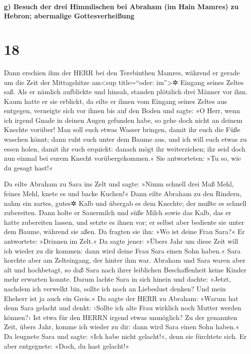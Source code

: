 \hypertarget{g-besuch-der-drei-himmlischen-bei-abraham-im-hain-mamres-zu-hebron-abermalige-gottesverheiuxdfung}{%
\paragraph{g) Besuch der drei Himmlischen bei Abraham (im Hain Mamres)
zu Hebron; abermalige
Gottesverheißung}\label{g-besuch-der-drei-himmlischen-bei-abraham-im-hain-mamres-zu-hebron-abermalige-gottesverheiuxdfung}}

\hypertarget{section-17}{%
\section{18}\label{section-17}}

 Dann erschien ihm der HERR bei den Terebinthen Mamres,
während er gerade um die Zeit der Mittagshitze am\textless sup
title=``oder: im''\textgreater✲ Eingang seines Zeltes saß.
 Als er nämlich aufblickte und hinsah, standen plötzlich
drei Männer vor ihm. Kaum hatte er sie erblickt, da eilte er ihnen vom
Eingang seines Zeltes aus entgegen, verneigte sich vor ihnen bis auf den
Boden  und sagte: »O Herr, wenn ich irgend Gnade in deinen
Augen gefunden habe, so gehe doch nicht an deinem Knechte vorüber!
 Man soll euch etwas Wasser bringen, damit ihr euch die
Füße waschen könnt; dann ruht euch unter dem Baume aus, 
und ich will euch etwas zu essen holen, damit ihr euch erquickt: danach
mögt ihr weiterziehen; ihr seid doch nun einmal bei eurem Knecht
vorübergekommen.« Sie antworteten: »Tu so, wie du gesagt hast!«

 Da eilte Abraham zu Sara ins Zelt und sagte: »Nimm
schnell drei Maß Mehl, feines Mehl, knete es und backe Kuchen!«
 Dann eilte Abraham zu den Rindern, nahm ein zartes,
gutes✲ Kalb und übergab es dem Knechte; der mußte es schnell zubereiten.
 Dann holte er Sauermilch und süße Milch sowie das Kalb,
das er hatte zubereiten lassen, und setzte es ihnen vor; er selbst aber
bediente sie unter dem Baume, während sie aßen.  Da
fragten sie ihn: »Wo ist deine Frau Sara?« Er antwortete: »Drinnen im
Zelt.«  Da sagte jener: »Übers Jahr um diese Zeit will
ich wieder zu dir kommen: dann wird deine Frau Sara einen Sohn haben.«
Sara horchte aber am Zelteingang, der hinter ihm war. 
Abraham und Sara waren aber alt und hochbetagt, so daß Sara nach ihrer
leiblichen Beschaffenheit keine Kinder mehr erwarten konnte.
 Darum lachte Sara in sich hinein und dachte: »Jetzt,
nachdem ich verwelkt bin, sollte ich noch an Liebeslust denken? Und mein
Eheherr ist ja auch ein Greis.«  Da sagte der HERR zu
Abraham: »Warum hat denn Sara gelacht und denkt: ›Sollte ich alte Frau
wirklich noch Mutter werden können?‹  Ist etwa für den
HERRN irgend etwas unmöglich? Zu der genannten Zeit, übers Jahr, komme
ich wieder zu dir: dann wird Sara einen Sohn haben.«  Da
leugnete Sara und sagte: »Ich habe nicht gelacht!«, denn sie fürchtete
sich. Er aber entgegnete: »Doch, du hast gelacht!«

